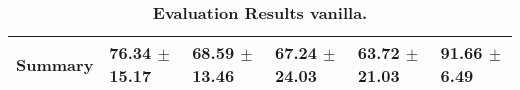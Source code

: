 \begin{table}[htb]
{\begin{tabular}{llllll}
\midrule
\textbf{Summary                                  } &                  \phantom{0}76.34 $\pm$ 15.17 &                      \phantom{0}68.59 $\pm$ 13.46 &                  \phantom{0}67.24 $\pm$ 24.03 &                  \phantom{0}63.72 $\pm$ 21.03 &  \phantom{0}91.66 $\pm$ \phantom{0}6.49 \\
\bottomrule
\end{tabular}%
}
\caption{\textbf{Evaluation Results vanilla.}}
\label{tab:eval-results}
\end{table}


